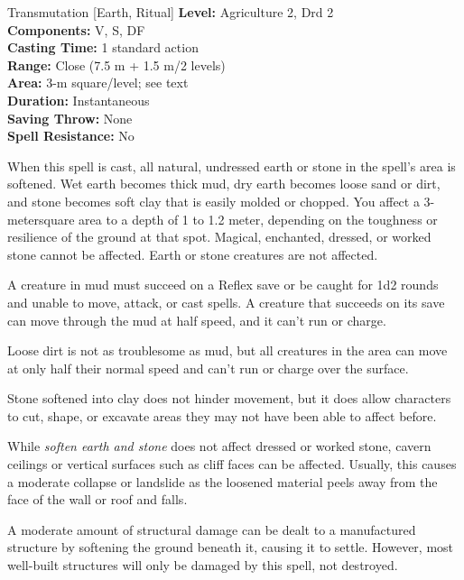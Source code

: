 {Transmutation [Earth, Ritual]}
{
	\textbf{Level:}
	Agriculture 2, Drd 2\\
	\textbf{Components:}
	V, S, DF\\
	\textbf{Casting Time:}
	1 standard action\\
	\textbf{Range:}
	Close (7.5 m + 1.5 m/2 levels)\\
	\textbf{Area:}
	3-m square/level; see text\\
	\textbf{Duration:}
	Instantaneous\\
	\textbf{Saving Throw:}
	None\\
	\textbf{Spell Resistance:}
	No\\
}
{
	When this spell is cast, all natural, undressed earth or stone in the spell's area is softened. Wet earth becomes thick mud, dry earth becomes loose sand or dirt, and stone becomes soft clay that is easily molded or chopped. You affect a 3-metersquare area to a depth of 1 to 1.2 meter, depending on the toughness or resilience of the ground at that spot. Magical, enchanted, dressed, or worked stone cannot be affected. Earth or stone creatures are not affected.

	A creature in mud must succeed on a Reflex save or be caught for 1d2 rounds and unable to move, attack, or cast spells. A creature that succeeds on its save can move through the mud at half speed, and it can't run or charge.

	Loose dirt is not as troublesome as mud, but all creatures in the area can move at only half their normal speed and can't run or charge over the surface.

	Stone softened into clay does not hinder movement, but it does allow characters to cut, shape, or excavate areas they may not have been able to affect before.

	While \emph{soften earth and stone} does not affect dressed or worked stone, cavern ceilings or vertical surfaces such as cliff faces can be affected. Usually, this causes a moderate collapse or landslide as the loosened material peels away from the face of the wall or roof and falls.

	A moderate amount of structural damage can be dealt to a manufactured structure by softening the ground beneath it, causing it to settle. However, most well-built structures will only be damaged by this spell, not destroyed.

}
